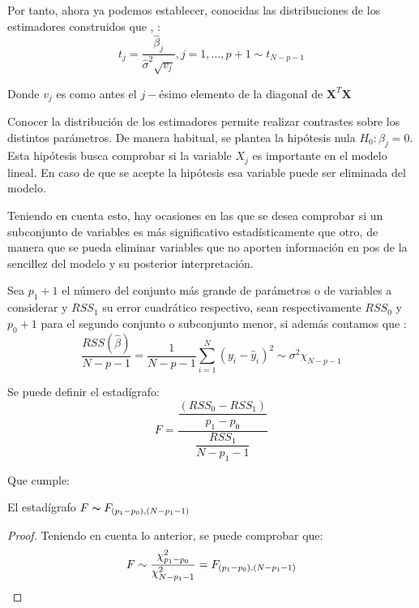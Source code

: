 \noindent Por tanto, ahora ya podemos establecer, conocidas las distribuciones de los estimadores construidos que \cite{Greene 2008}, \cite{Hastie 2001}:
\begin{equation}
t_j=\dfrac{\hat{\beta}_j}{\hat{\sigma}^2\sqrt{v_j}}, j=1,\ldots ,p+1 \sim t_{N-p-1}
\end{equation}

\noindent Donde $v_j$ es como antes el $j-$ésimo elemento de la diagonal de $\mathbf{X}^T \mathbf{X}$

\noindent Conocer la distribución de los estimadores permite realizar contrastes sobre los distintos parámetros. De manera habitual, se plantea la hipótesis nula $H_0: \beta_j=0 $. Esta hipótesis busca comprobar si la variable $X_j$ es importante en el modelo lineal. En caso de que se acepte la hipótesis esa variable puede ser eliminada del modelo. 


\noindent Teniendo en cuenta esto,  hay ocasiones en las que se desea comprobar si un subconjunto de variables es más significativo estadísticamente que otro, de manera que se pueda eliminar variables que no aporten información en pos de la sencillez del modelo y su posterior interpretación. 

\noindent Sea $p_1+1$ el número del conjunto más grande de parámetros o de variables a considerar y $RSS_1$ su error cuadrático respectivo, sean respectivamente $RSS_0$ y $p_0+1$ para el segundo conjunto o subconjunto menor, si además contamos que :
\begin{equation}
\frac{RSS(\hat{\beta})}{N-p-1}=\frac{1}{N-p-1}\sum_{i=1}^N(y_i-\hat{y}_i)^2\sim \sigma^2 \chi_{N-p-1}
\end{equation}

\noindent Se puede definir el estadígrafo: 
\begin{equation}\label{ec.F}
F=\dfrac{\dfrac{(RSS_0-RSS_1)}{p_1-p_0}}{\dfrac{RSS_1}{N-p_1-1}} 
\end{equation}

\noindent Que cumple: 
\begin{propo}
El estadígrafo $F\thicksim F_{(p_1-p_0),(N-p_1-1)}$
\begin{proof}
Teniendo en cuenta lo anterior, se puede comprobar que:
\begin{equation}
F\sim \dfrac{\chi^2_{p_1-p_0}}{\chi^2_{N-p_1-1}}=F_{(p_1-p_0),(N-p_1-1)}\qedhere
\end{equation}
\end{proof}
\end{propo}

